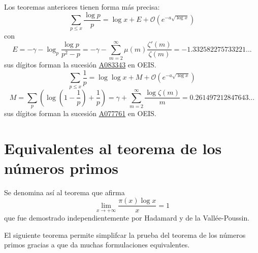 \documentclass[TAN.tex]{subfiles}
\begin{document}
Los teoremas anteriores tienen forma más precisa:
\[ \sum_{p≤x} \frac{\log p}{p} = \log x + E + \mathcal{O}(e^{-a\sqrt{\log x}}) \]
con
\[ E = -γ-\log_{p} \frac{\log p}{p^2-p} = -γ-\sum_{m=2}^{∞} μ(m) \frac{ζ'(m)}{ζ(m)} = -1.332582275733221... \]
sus dígitos forman la sucesión \href{https://oeis.org/A083343}{A083343} en OEIS.
\[ \sum_{p≤x} \frac{1}{p} = \log \log x + M + \mathcal{O}(e^{-a\sqrt{\log x}}) \]
\[ M = \sum_{p} \left(\log \left(1-\frac{1}{p}\right)+\frac{1}{p}\right) = γ + \sum_{m=2}^{∞} \frac{\log ζ(m)}{m} = 0.261497212847643... \]
sus dígitos forman la sucesión \href{https://oeis.org/A077761}{A077761} en OEIS. 

\section{Equivalentes al teorema de los números primos}
Se denomina así al teorema que afirma
\[ \lim_{x\to+∞} \frac{π(x)\log x}{x} = 1 \]
que fue demostrado independientemente por Hadamard y de la Vallée-Poussin.

El siguiente teorema permite simplifcar la prueba del teorema de los números primos gracias a que da muchas formulaciones equivalentes.
\end{document}
